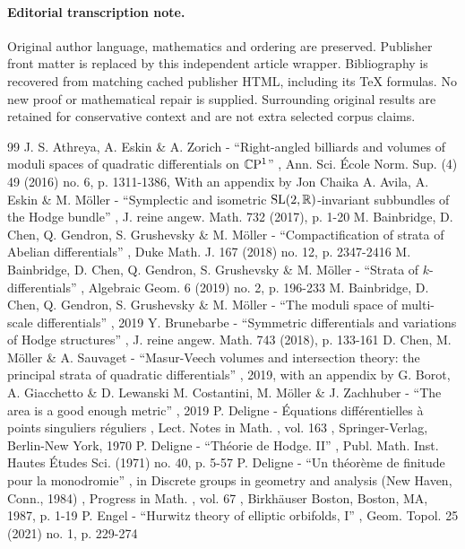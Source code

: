 \documentclass[11pt]{article}
\numberwithin{equation}{section}
\begin{document}
\paragraph{Editorial transcription note.}
Original author language, mathematics and ordering are preserved. Publisher front matter is replaced by this independent article wrapper. Bibliography is recovered from matching cached publisher HTML, including its TeX formulas. No new proof or mathematical repair is supplied. Surrounding original results are retained for conservative context and are not extra selected corpus claims.
\clearpage

\begin{thebibliography}{99}
 J. S. Athreya, A. Eskin \& A. Zorich - “Right-angled billiards and volumes of moduli spaces of quadratic differentials on $\mathbb{C}\rm P^1$” , Ann. Sci. École Norm. Sup. (4) 49 (2016) no. 6, p. 1311-1386, With an appendix by Jon Chaika
 A. Avila, A. Eskin \& M. Möller - “Symplectic and isometric ${\rm SL}(2,\mathbb{R})$-invariant subbundles of the Hodge bundle” , J. reine angew. Math. 732 (2017), p. 1-20
 M. Bainbridge, D. Chen, Q. Gendron, S. Grushevsky \& M. Möller - “Compactification of strata of Abelian differentials” , Duke Math. J. 167 (2018) no. 12, p. 2347-2416
 M. Bainbridge, D. Chen, Q. Gendron, S. Grushevsky \& M. Möller - “Strata of $k$-differentials” , Algebraic Geom. 6 (2019) no. 2, p. 196-233
 M. Bainbridge, D. Chen, Q. Gendron, S. Grushevsky \& M. Möller - “The moduli space of multi-scale differentials” , 2019
 Y. Brunebarbe - “Symmetric differentials and variations of Hodge structures” , J. reine angew. Math. 743 (2018), p. 133-161
 D. Chen, M. Möller \& A. Sauvaget - “Masur-Veech volumes and intersection theory: the principal strata of quadratic differentials” , 2019, with an appendix by G. Borot, A. Giacchetto \& D. Lewanski
 M. Costantini, M. Möller \& J. Zachhuber - “The area is a good enough metric” , 2019
 P. Deligne - Équations différentielles à points singuliers réguliers , Lect. Notes in Math. , vol. 163 , Springer-Verlag, Berlin-New York, 1970
 P. Deligne - “Théorie de Hodge. II” , Publ. Math. Inst. Hautes Études Sci. (1971) no. 40, p. 5-57
 P. Deligne - “Un théorème de finitude pour la monodromie” , in Discrete groups in geometry and analysis (New Haven, Conn., 1984) , Progress in Math. , vol. 67 , Birkhäuser Boston, Boston, MA, 1987, p. 1-19
 P. Engel - “Hurwitz theory of elliptic orbifolds, I” , Geom. Topol. 25 (2021) no. 1, p. 229-274

\end{thebibliography}
\end{document}

